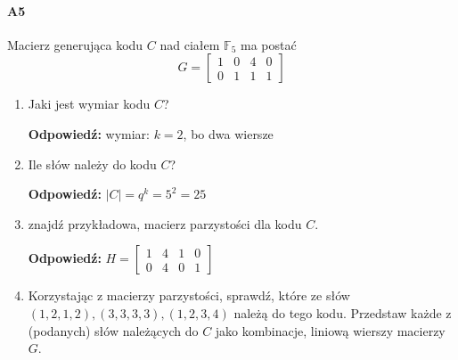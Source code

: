 \documentclass[a4paper,12pt]{article}
\theoremstyle{definition}%
\theoremstyle{definition}
\theoremstyle{problem}
\begin{document}
\paragraph{A5} Macierz generująca kodu $C$ nad ciałem $\mathbb{F}_5$ ma postać
$$G =\begin{bmatrix}
1& 0& 4& 0\\
0& 1& 1& 1 \end{bmatrix}$$
\begin{enumerate}[label=\alph*)]
\item Jaki jest wymiar kodu $C$?

\textbf{Odpowiedź: }wymiar: $k=2$, bo dwa wiersze
\item Ile słów należy do kodu $C$?

\textbf{Odpowiedź: }$|C|=q^k=5^2=25$
\item znajdź przykładowa, macierz parzystości dla kodu $C$.

\textbf{Odpowiedź: }$H=\begin{bmatrix}
1&4&1&0\\0&4&0&1
\end{bmatrix}$
\item  Korzystając z macierzy parzystości, sprawdź, które ze słów $(1, 2, 1, 2),(3, 3, 3, 3),(1, 2, 3, 4)$ należą do tego kodu. Przedstaw każde z (podanych) słów należących do $C$ jako kombinacje, liniową wierszy macierzy $G$.


\end{enumerate}
\end{document}
